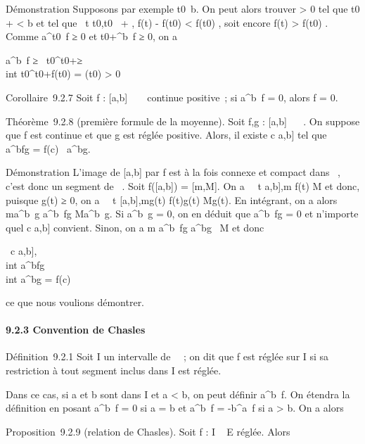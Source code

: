 Démonstration Supposons par exemple
t0\neq~b. On peut alors trouver \eta
\textgreater{} 0 tel que t0 + \eta \textless{} b et tel que
\forall~t \in {[}t0,t0~ + \eta{]},
\textbar{}f(t) - f(t0)\textbar{} \textless{} f(t0)
 , soit encore f(t) \textgreater{}
f(t0)  . Comme
\int  a^t0~f ≥ 0 et
\int  t0+\eta^b~f ≥ 0, on
a

\int  a^b~f
≥\int ~
t0^t0+\etaf ≥\\int
 t0^t0+\eta f(t0)
 = \etaf(t0) 
\textgreater{} 0

Corollaire~9.2.7 Soit f : {[}a,b{]} \rightarrow~ ~ continue positive~; si
\int  a^b~f = 0, alors f = 0.

Théorème~9.2.8 (première formule de la moyenne). Soit f,g : {[}a,b{]} \rightarrow~
~. On suppose que f est continue et que g est réglée positive. Alors, il
existe c \in {[}a,b{]} tel que \int ~
a^bfg = f(c)\int ~
a^bg.

Démonstration L'image de {[}a,b{]} par f est à la fois connexe et
compact dans ~, c'est donc un segment de ~. Soit f({[}a,b{]}) =
{[}m,M{]}. On a \forall~~t \in {[}a,b{]},m \leq f(t) \leq M et
donc, puisque g(t) ≥ 0, on a \forall~~t \in
{[}a,b{]},mg(t) \leq f(t)g(t) \leq Mg(t). En intégrant, on a alors
m\int  a^b~g
\leq\int  a^b~fg \leq
M\int  a^b~g. Si
\int  a^b~g = 0, on en déduit que
\int  a^b~fg = 0 et n'importe
quel c \in {[}a,b{]} convient. Sinon, on a m \leq
\int  a^b~fg \over
\int  a^bg~ \leq M et donc

\exists~c \in {[}a,b{]}, \\int
 a^bfg \over \\int
 a^bg = f(c)

ce que nous voulions démontrer.

\paragraph{9.2.3 Convention de Chasles}

Définition~9.2.1 Soit I un intervalle de ~~; on dit que f est réglée sur
I si sa restriction à tout segment inclus dans I est réglée.

Dans ce cas, si a et b sont dans I et a \textless{} b, on peut définir
\int  a^b~f. On étendra la
définition en posant \int  a^b~f
= 0 si a = b et \int  a^b~f =
-\int  b^a~f si a \textgreater{}
b. On a alors

Proposition~9.2.9 (relation de Chasles). Soit f : I \rightarrow~ E réglée. Alors

